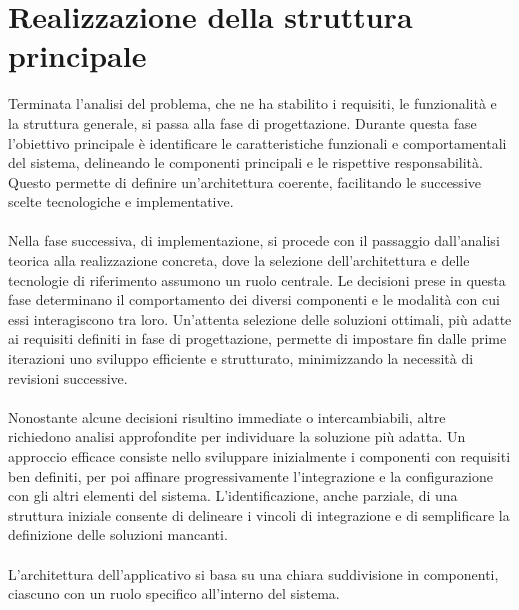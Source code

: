 \chapter{Realizzazione della struttura principale}

Terminata l'analisi del problema, che ne ha stabilito i requisiti,
le funzionalità e la struttura generale,
si passa alla fase di progettazione.
Durante questa fase l'obiettivo principale è identificare 
le caratteristiche funzionali e comportamentali del sistema,
delineando le componenti principali e le rispettive responsabilità.
Questo permette di definire un'architettura coerente,
facilitando le successive scelte tecnologiche e implementative.\\
\\
Nella fase successiva, di implementazione,
si procede con il passaggio dall'analisi teorica alla realizzazione concreta,
dove la selezione dell'architettura e delle tecnologie di riferimento assumono un ruolo centrale.
Le decisioni prese in questa fase determinano il comportamento dei diversi componenti e
le modalità con cui essi interagiscono tra loro.
Un'attenta selezione delle soluzioni ottimali, 
più adatte ai requisiti definiti in fase di progettazione,
permette di impostare fin dalle prime iterazioni uno sviluppo efficiente e strutturato,
minimizzando la necessità di revisioni successive.\\
\\
Nonostante alcune decisioni risultino immediate o intercambiabili,
altre richiedono analisi approfondite per individuare la soluzione più adatta.
Un approccio efficace consiste nello sviluppare inizialmente i componenti con requisiti ben definiti,
per poi affinare progressivamente l'integrazione e la configurazione con gli altri elementi del sistema.
L'identificazione, anche parziale, di una struttura iniziale 
consente di delineare i vincoli di integrazione e
di semplificare la definizione delle soluzioni mancanti.\\
\\
L'architettura dell'applicativo si basa su una chiara suddivisione in componenti,
ciascuno con un ruolo specifico all'interno del sistema.
\\

